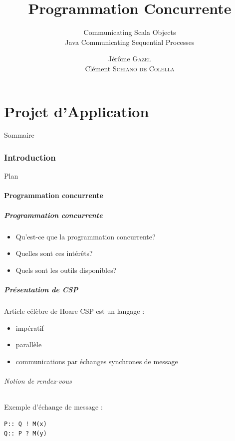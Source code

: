 \documentclass[slidetop,11pt]{beamer}
\title{Programmation Concurrente}
\subtitle{Communicating Scala Objects\\Java Communicating Sequential Processes}
\author{Jérôme \textsc{Gazel} \\ Clément \textsc{Schiano de Colella}}
\institute{\'Ecole Centrale de Nantes}
\date{\oldstylenums{vendredi 25 mars 2011}}
\begin{document}
\frame{\titlepage}
%
\part{Projet d'Application} 
\begin{frame}{Sommaire}
  \small \tableofcontents[hideallsubsections]
\end{frame} 


\section{Introduction}
\begin{frame}{Plan}
  \tableofcontents[sections=\thesection]
\end{frame}
\subsection{Programmation concurrente}
\begin{frame}[label=pagesimple]
  \frametitle{Programmation concurrente}
    \begin{itemize}[<+->]
  \item Qu'est-ce que la programmation concurrente?
  \item Quelles sont ces intérêts?
   \item Quels sont les outils disponibles?
    \end{itemize}
\end{frame}

\begin{frame} 
  \frametitle{Présentation de CSP}
  Article célèbre de Hoare
  CSP est un langage :
\begin{itemize}[<+->]
\item impératif
\item parallèle
\item communications par échanges synchrones de message
 \end{itemize}
\end{frame}

\begin{frame} [containsverbatim]
\framesubtitle{Notion de rendez-vous}
Exemple d'échange de message :
\begin{lstlisting}[frame=trBL]
P:: Q ! M(x)
Q:: P ? M(y)
\end{lstlisting}
\end{frame}
\end{document}
